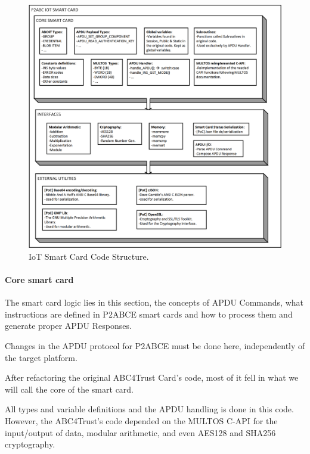 \begin{figure}[bth]
	\begin{center}
		\includegraphics[width=\linewidth]{gfx/IoTCScomponents-bw}
	\end{center}
	\caption{IoT Smart Card Code Structure.}
	\label{fig:IoTCScomponents-bw}
\end{figure}


\hfil

\paragraph{Core smart card}

The smart card logic lies in this section, the concepts of APDU Commands, what instructions are defined in P2ABCE smart cards and how to process them and generate proper APDU Responses.

Changes in the APDU protocol for P2ABCE must be done here, independently of the target platform.

After refactoring the original ABC4Trust Card's code, most of it fell in what we will call the core of the smart card.

All types and variable definitions and the APDU handling is done in this code.
However, the ABC4Trust's code depended on the MULTOS C-API for the input/output of data, modular arithmetic, and even AES128 and SHA256 cryptography.

